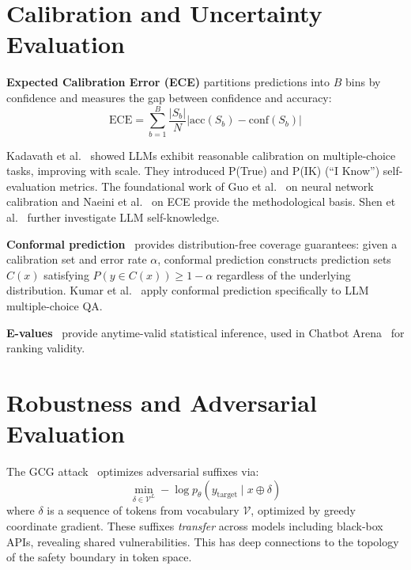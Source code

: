 \documentclass[11pt]{article}
\begin{document}
\section{Calibration and Uncertainty Evaluation}
\label{sec:calibration}

\textbf{Expected Calibration Error (ECE)} partitions predictions into $B$ bins by confidence and measures the gap between confidence and accuracy:
\begin{equation}
\text{ECE} = \sum_{b=1}^{B} \frac{|S_b|}{N} |\text{acc}(S_b) - \text{conf}(S_b)|
\end{equation}

Kadavath et al.~\cite{kadavath2022language} showed LLMs exhibit reasonable calibration on multiple-choice tasks, improving with scale. They introduced P(True) and P(IK) (``I Know'') self-evaluation metrics. The foundational work of Guo et al.~\cite{guo2017calibration} on neural network calibration and Naeini et al.~\cite{naeini2015ece} on ECE provide the methodological basis. Shen et al.~\cite{shen2023largelm} further investigate LLM self-knowledge.

\textbf{Conformal prediction}~\cite{stutz2023conformal,angelopoulos2022conformal} provides distribution-free coverage guarantees: given a calibration set and error rate $\alpha$, conformal prediction constructs prediction sets $C(x)$ satisfying $P(y \in C(x)) \geq 1 - \alpha$ regardless of the underlying distribution. Kumar et al.~\cite{kumar2023conformal} apply conformal prediction specifically to LLM multiple-choice QA.

\textbf{E-values}~\cite{vovk2021evalues} provide anytime-valid statistical inference, used in Chatbot Arena~\cite{chiang2024chatbot} for ranking validity.

\section{Robustness and Adversarial Evaluation}
\label{sec:robustness}

The GCG attack~\cite{zou2023universal} optimizes adversarial suffixes via:
\begin{equation}
\min_{\delta \in \mathcal{V}^L} -\log p_\theta(y_{\text{target}} \mid x \oplus \delta)
\end{equation}
where $\delta$ is a sequence of tokens from vocabulary $\mathcal{V}$, optimized by greedy coordinate gradient. These suffixes \emph{transfer} across models including black-box APIs, revealing shared vulnerabilities. This has deep connections to the topology of the safety boundary in token space.
\end{document}
